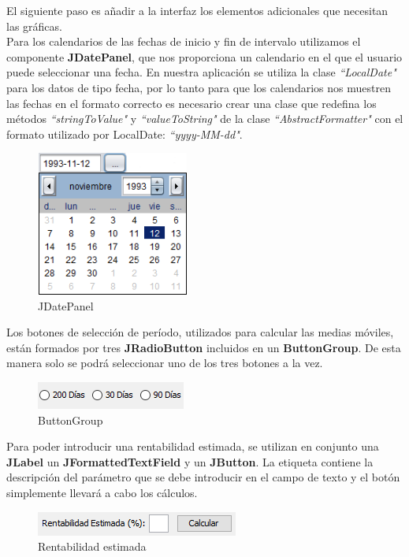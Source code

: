 \documentclass[12pt, a4paper]{article}
\begin{document}
El siguiente paso es añadir a la interfaz los elementos adicionales que necesitan las gráficas.\\

Para los calendarios de las fechas de inicio y fin de intervalo utilizamos el componente \textbf{JDatePanel}, que nos proporciona un calendario en el que el usuario puede seleccionar una fecha. En nuestra aplicación se utiliza la clase \textit{``LocalDate"} para los datos de tipo fecha, por lo tanto para que los calendarios nos muestren las fechas en el formato correcto es necesario crear una clase que redefina los métodos \textit{``stringToValue"} y \textit{``valueToString"} de la clase \textit{``AbstractFormatter"} con el formato utilizado por LocalDate: \textit{``yyyy-MM-dd"}.

\begin{figure}[htbp]
	\centering
	\includegraphics[width=5cm]{figuras/JDatePanel.png}
	\caption{JDatePanel}
	\label{fig:JDatePanel}
	\end {figure}

Los botones de selección de período, utilizados para calcular las medias móviles, están formados por tres \textbf{JRadioButton} incluidos en un \textbf{ButtonGroup}. De esta manera solo se podrá seleccionar uno de los tres botones a la vez.

\begin{figure}[htbp]
	\centering
	\includegraphics{figuras/ButtonGroup.png}
	\caption{ButtonGroup}
	\label{fig:ButtonGroup}
	\end {figure}
	
Para poder introducir una rentabilidad estimada, se utilizan en conjunto una \textbf{JLabel} un \textbf{JFormattedTextField} y un \textbf{JButton}. La etiqueta contiene la descripción del parámetro que se debe introducir en el campo de texto y el botón simplemente llevará a cabo los cálculos.

\begin{figure}[htbp]
	\centering
	\includegraphics{figuras/Calculos.png}
	\caption{Rentabilidad estimada}
	\label{fig:calculos}
	\end {figure}
\end{document}
